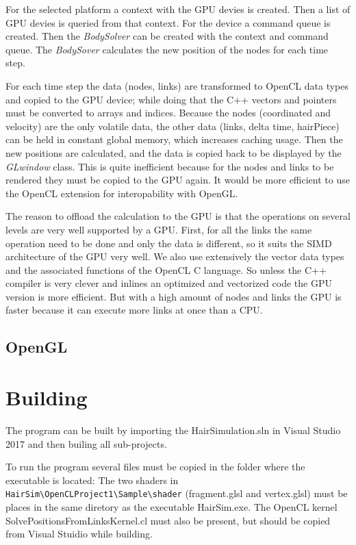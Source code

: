 \documentclass[11pt,a4paper]{scrartcl}
\begin{document}
For the selected platform a context with the GPU devies is created. Then a list of GPU devies is queried from that context. For the device a command queue is created. Then the \textit{BodySolver} can be created with the context and command queue. The \textit{BodySover} calculates the new position of the nodes for each time step.

For each time step the data (nodes, links) are transformed to OpenCL data types and copied to the GPU device; while doing that the C++ vectors and pointers must be converted to arrays and indices. Because the nodes (coordinated and velocity) are the only volatile data, the other data (links, delta time, hairPiece) can be held in constant global memory, which increases caching usage. Then the new positions are calculated, and the data is copied back to be displayed by the \textit{GLwindow} class. This is quite inefficient because for the nodes and links to be rendered they must be copied to the GPU again. It would be more efficient to use the OpenCL extension for interopability with OpenGL.

The reason to offload the calculation to the GPU is that the operations on several levels are very well supported by a GPU. First, for all the links the same operation need to be done and only the data is different, so it suits the SIMD architecture of the GPU very well. We also use extensively the vector data types and the associated functions of the OpenCL C language. So unless the C++ compiler is very clever and inlines an optimized and vectorized code the GPU version is more efficient. But with a high amount of nodes and links the GPU is faster because it can execute more links at once than a CPU.

\subsection{OpenGL}


\section{Building}
The program can be built by importing the HairSimulation.sln in Visual Studio 2017 and then builing all sub-projects.

To run the program several files must be copied in the folder where the executable is located: The two shaders in \verb|HairSim\OpenCLProject1\Sample\shader| (fragment.glsl and vertex.glsl) must be places in the same diretory as the executable HairSim.exe. The OpenCL kernel SolvePositionsFromLinksKernel.cl must also be present, but should be copied from Visual Stuidio while building.
\end{document}
